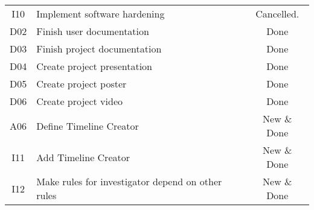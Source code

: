 \begin{table}[!ht]
\begin{center}
\begin{tabular}{c|l|c}
		I10 & Implement software hardening & Cancelled. \\
		D02 & Finish user documentation & Done \\
		D03 & Finish project documentation & Done \\ 
		D04 & Create project presentation & Done \\
		D05 & Create project poster & Done \\
		D06 & Create project video & Done \\
		A06 & Define Timeline Creator & New \& Done \\
		I11 & Add Timeline Creator & New \& Done \\
		I12 & Make rules for investigator depend on other rules & New \& Done \\
    \end{tabular}
  \end{center}
\end{table}
